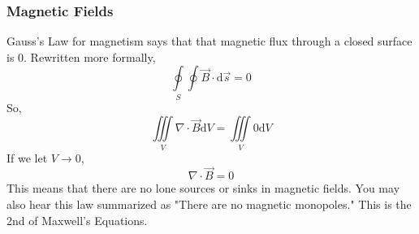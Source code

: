 \subsubsection{Magnetic Fields}
\noindent
Gauss's Law for magnetism says that that magnetic flux through a closed surface is 0. Rewritten more formally, 
\begin{equation*}
	\oint\limits_{S}\oint{\vec{B} \cdot \mathrm{d}\vec{s}} = 0	
\end{equation*}
So, 
\begin{equation*}
	\iiint\limits_{V}{\nabla \cdot \vec{B}\mathrm{d}V} = \iiint\limits_{V}{0\mathrm{d}V}
\end{equation*}
If we let $V \to 0$, 
\begin{equation*}
	\nabla \cdot \vec{B} = 0	
\end{equation*}
This means that there are no lone sources or sinks in magnetic fields. You may also hear this law summarized as "There are no magnetic monopoles." This is the 2nd of Maxwell's Equations.